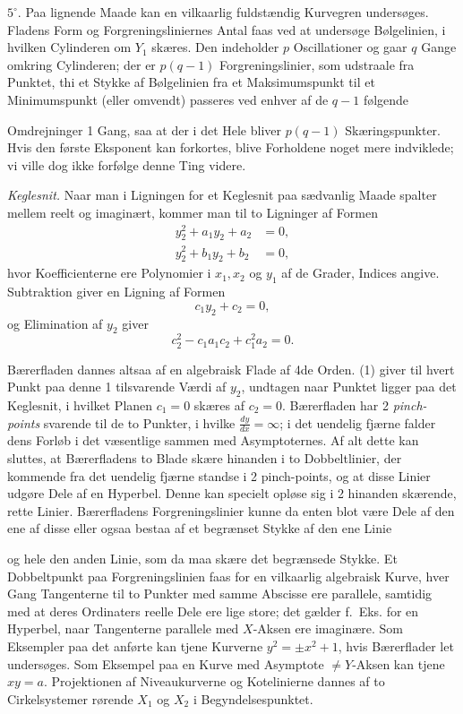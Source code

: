 \documentclass{article}
\begin{document}
$5^\circ$. Paa lignende Maade kan en vilkaarlig fuldstændig Kurvegren undersøges. Fladens Form og Forgreningsliniernes Antal faas ved at undersøge Bølgelinien, i hvilken Cylinderen om $Y_1$ skæres. Den indeholder $p$ Oscillationer og gaar $q$ Gange omkring Cylinderen; der er $p(q - 1)$ Forgreningslinier, som udstraale fra Punktet, thi et Stykke af Bølgelinien fra et Maksimumspunkt til et Minimumspunkt (eller omvendt) passeres ved enhver af de $q - 1$ følgende

Omdrejninger 1 Gang, saa at der i det Hele bliver $p(q - 1)$ Skæringspunkter. Hvis den første Eksponent kan forkortes, blive Forholdene noget mere indviklede; vi ville dog ikke forfølge denne Ting videre.

\emph{Keglesnit.} Naar man i Ligningen for et Keglesnit paa sædvanlig Maade spalter mellem reelt og imaginært, kommer man til to Ligninger af Formen
\[
\begin{aligned}
y_2^2 + a_1 y_2 + a_2 &= 0, \\
y_2^2 + b_1 y_2 + b_2 &= 0,
\end{aligned}
\]
hvor Koefficienterne ere Polynomier i $x_1, x_2$ og $y_1$ af de Grader, Indices angive. Subtraktion giver en Ligning af Formen
\[
c_1 y_2 + c_2 = 0, \tag{1}
\]
og Elimination af $y_2$ giver
\[
c_2^2 - c_1 a_1 c_2 + c_1^2 a_2 = 0. \tag{2}
\]

Bærerfladen dannes altsaa af en algebraisk Flade af 4de Orden. (1) giver til hvert Punkt paa denne 1 tilsvarende Værdi af $y_2$, undtagen naar Punktet ligger paa det Keglesnit, i hvilket Planen $c_1 = 0$ skæres af $c_2 = 0$. Bærerfladen har 2 \emph{pinch-points} svarende til de to Punkter, i hvilke $\frac{dy}{dx} = \infty$; i det uendelig fjærne falder dens Forløb i det væsentlige sammen med Asymptoternes. Af alt dette kan sluttes, at Bærerfladens to Blade skære hinanden i to Dobbeltlinier, der kommende fra det uendelig fjærne standse i 2 pinch-points, og at disse Linier udgøre Dele af en Hyperbel. Denne kan specielt opløse sig i 2 hinanden skærende, rette Linier. Bærerfladens Forgreningslinier kunne da enten blot være Dele af den ene af disse eller ogsaa bestaa af et begrænset Stykke af den ene Linie

og hele den anden Linie, som da maa skære det begrænsede Stykke. Et Dobbeltpunkt paa Forgreningslinien faas for en vilkaarlig algebraisk Kurve, hver Gang Tangenterne til to Punkter med samme Abscisse ere parallele, samtidig med at deres Ordinaters reelle Dele ere lige store; det gælder f.~Eks. for en Hyperbel, naar Tangenterne parallele med $X$-Aksen ere imaginære. Som Eksempler paa det anførte kan tjene Kurverne $y^2 = \pm x^2 + 1$, hvis Bærerflader let undersøges. Som Eksempel paa en Kurve med Asymptote $\neq Y$-Aksen kan tjene $xy = a$. Projektionen af Niveaukurverne og Kotelinierne dannes af to Cirkelsystemer rørende $X_1$ og $X_2$ i Begyndelsespunktet.
\end{document}
